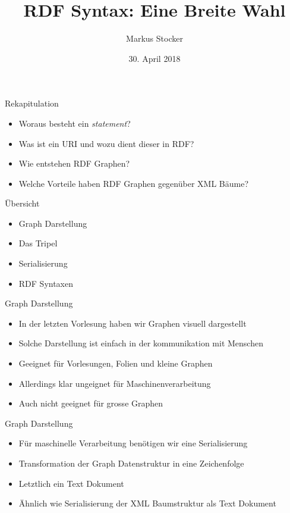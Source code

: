 \documentclass{beamer}
\title{RDF Syntax: Eine Breite Wahl}
\author{Markus Stocker}
\date{30. April 2018}
\begin{document}
\maketitle

\begin{frame}{Rekapitulation}
	
	\begin{itemize}
		\item Woraus besteht ein \emph{statement}?
		\item Was ist ein URI und wozu dient dieser in RDF?
		\item Wie entstehen RDF Graphen?
		\item Welche Vorteile haben RDF Graphen gegenüber XML Bäume?
	\end{itemize}
	
\end{frame}

\begin{frame}{Übersicht}
	
	\begin{itemize}
		\item Graph Darstellung
		\item Das Tripel
		\item Serialisierung
		\item RDF Syntaxen
	\end{itemize}
	
\end{frame}

\begin{frame}{Graph Darstellung}
	
	\begin{itemize}
		\item In der letzten Vorlesung haben wir Graphen visuell dargestellt
		\item Solche Darstellung ist einfach in der kommunikation mit Menschen
		\item Geeignet für Vorlesungen, Folien und kleine Graphen
		\item Allerdings klar ungeignet für Maschinenverarbeitung
		\item Auch nicht geeignet für grosse Graphen
	\end{itemize}
	
\end{frame}

\begin{frame}{Graph Darstellung}
	
	\begin{itemize}
		\item Für maschinelle Verarbeitung benötigen wir eine Serialisierung
		\item Transformation der Graph Datenstruktur in eine Zeichenfolge
		\item Letztlich ein Text Dokument
		\item Ähnlich wie Serialisierung der XML Baumstruktur als Text Dokument
	\end{itemize}
	
\end{frame}
\end{document}
